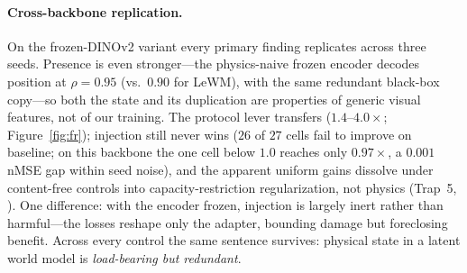 \paragraph{Cross-backbone replication.}
On the frozen-DINOv2 variant every primary finding replicates across three seeds. Presence is even stronger---the physics-naive frozen encoder decodes position at $\rho{=}0.95$ (vs.\ $0.90$ for LeWM), with the same redundant black-box copy---so both the state and its duplication are properties of generic visual features, not of our training. The protocol lever transfers ($1.4$--$4.0\times$; Figure~\ref{fig:fr}); injection still never wins ($26$ of $27$ cells fail to improve on baseline; on this backbone the one cell below $1.0$ reaches only $0.97\times$, a $0.001$ nMSE gap within seed noise), and the apparent uniform gains dissolve under content-free controls into capacity-restriction regularization, not physics (Trap~5, ). One difference: with the encoder frozen, injection is largely inert rather than harmful---the losses reshape only the adapter, bounding damage but foreclosing benefit. Across every control the same sentence survives: physical state in a latent world model is \emph{load-bearing but redundant}.
